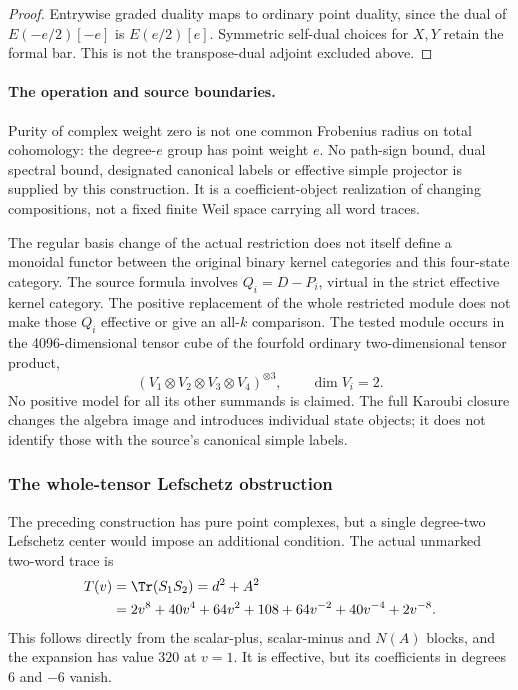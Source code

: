 \begin{proof}
Entrywise graded duality maps to ordinary point
duality, since the dual of \(E(-e/2)[-e]\) is
\(E(e/2)[e]\). Symmetric self-dual choices for
\(X,Y\) retain the formal bar. This is not the
transpose-dual adjoint excluded above.
\end{proof}

\paragraph{The operation and source boundaries.}
Purity of complex weight zero is not one common
Frobenius radius on total cohomology: the degree-\(e\)
group has point weight \(e\).
No path-sign bound, dual spectral bound, designated
canonical labels or effective simple projector
is supplied by this construction.
It is a coefficient-object realization of changing
compositions, not a fixed finite Weil space carrying
all word traces.

The regular basis change of the actual restriction
does not itself define a monoidal functor between
the original binary kernel categories and this
four-state category. The source formula involves
\(Q_i=D-P_i\), virtual in the strict effective
kernel category. The positive replacement of the
whole restricted module does not make those
\(Q_i\) effective or give an all-\(k\) comparison.
The tested module occurs in the 4096-dimensional
tensor cube of the fourfold ordinary two-dimensional
tensor product,
\[
                   (V_1\otimes V_2\otimes V_3\otimes V_4)^{\otimes3},
                       \qquad \dim V_i=2.
\]
No positive model for all its other summands is
claimed. The full Karoubi closure changes the
algebra image and introduces individual state
objects; it does not identify those with the
source's canonical simple labels.

\subsubsection{The whole-tensor Lefschetz obstruction}

The preceding construction has pure point
complexes, but a single degree-two Lefschetz
center would impose an additional condition.
The actual unmarked two-word trace is
\begin{align}\label{eq:positiveIteratedWholeTrace}
 T(v)&=\Tr(S_1S_2)=d^2+A^2\\
 &=2v^8+40v^4+64v^2+108
                  +64v^{-2}+40v^{-4}+2v^{-8}.\notag
\end{align}
This follows directly from the scalar-plus,
scalar-minus and \(N(A)\) blocks, and the
expansion has value \(320\) at \(v=1\).
It is effective, but its coefficients in
degrees \(6\) and \(-6\) vanish.

